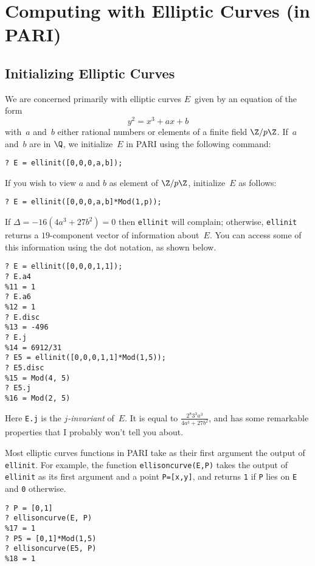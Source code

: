 \documentclass[11pt]{report}
\begin{document}
\chapter{Computing with Elliptic Curves {\tiny (in PARI)}}

\section{Initializing Elliptic Curves}
We are concerned primarily with elliptic curves
$E$~given by an equation of the form
$$
  y^2 = x^3 + ax + b
$$
with~$a$ and~$b$ either rational
numbers or elements of a finite field $\Z/p\Z$.  If~$a$ and~$b$ are
in $\Q$, we initialize~$E$ in PARI using the following command:
\begin{verbatim}
? E = ellinit([0,0,0,a,b]);
\end{verbatim}
If you wish to view $a$ and $b$ as element of $\Z/p\Z$, initialize~$E$
as follows:
\begin{verbatim}
? E = ellinit([0,0,0,a,b]*Mod(1,p));
\end{verbatim}
If $\Delta = -16(4a^3 + 27b^2)= 0$ then
  {\tt ellinit} will complain; otherwise, {\tt ellinit} returns
a $19$-component vector of information about~$E$.  You can
access some of this information using the
dot notation, as shown below.
\begin{verbatim}
? E = ellinit([0,0,0,1,1]); 
? E.a4
%11 = 1
? E.a6
%12 = 1
? E.disc
%13 = -496
? E.j  
%14 = 6912/31
? E5 = ellinit([0,0,0,1,1]*Mod(1,5));
? E5.disc
%15 = Mod(4, 5)
? E5.j
%16 = Mod(2, 5)
\end{verbatim}
Here {\tt E.j} is the {\em $j$-invariant} of~$E$.  It is
equal to $ \frac{2^8 3^3 a^3}{4a^3 + 27b^2}$,
and has some remarkable properties that I probably
won't tell you about.

Most elliptic curves functions in PARI take as their first argument
the output of {\tt ellinit}.  For example, the function
  {\tt ellisoncurve(E,P)} takes the output of {\tt ellinit} as its
first argument and a point {\tt P=[x,y]}, and returns {\tt 1} if {\tt P}
lies on {\tt E} and {\tt 0} otherwise.
\begin{verbatim}
? P = [0,1]
? ellisoncurve(E, P)
%17 = 1
? P5 = [0,1]*Mod(1,5) 
? ellisoncurve(E5, P)
%18 = 1
\end{verbatim}
\end{document}
